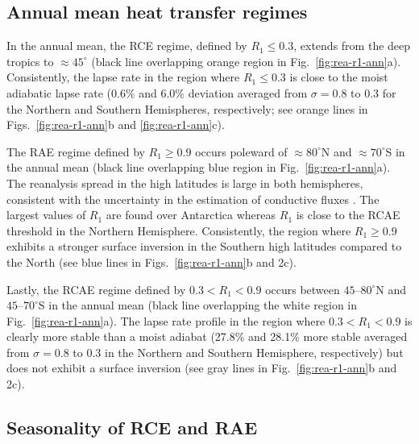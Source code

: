 \documentclass{ametsocV5}
\begin{document}
    \subsection{Annual mean heat transfer regimes}

    In the annual mean, the RCE regime, defined by $R_1 \le 0.3$, extends from the deep tropics to $\approx 45^\circ$ (black line overlapping orange region in Fig.~\ref{fig:rea-r1-ann}a). Consistently, the lapse rate in the region where $R_1 \le 0.3$ is close to the moist adiabatic lapse rate ($0.6$\% and 6.0\% deviation averaged from $\sigma=0.8$ to 0.3 for the Northern and Southern Hemispheres, respectively; see orange lines in Figs.~\ref{fig:rea-r1-ann}b and \ref{fig:rea-r1-ann}c).

    The RAE regime defined by $R_1 \ge 0.9$ occurs poleward of $\approx 80^\circ$N and $\approx 70^\circ$S in the annual mean (black line overlapping blue region in Fig.~\ref{fig:rea-r1-ann}a). The reanalysis spread in the high latitudes is large in both hemispheres, consistent with the uncertainty in the estimation of conductive fluxes \citep{tastula2013,graham2019}. The largest values of $R_1$ are found over Antarctica whereas $R_1$ is close to the RCAE threshold in the Northern Hemisphere. Consistently, the region where $R_1 \ge 0.9$ exhibits a stronger surface inversion in the Southern high latitudes compared to the North (see blue lines in Figs.~\ref{fig:rea-r1-ann}b and 2c).

    Lastly, the RCAE regime defined by $0.3 < R_1 < 0.9$ occurs between $45$--$80^\circ$N and $45$--$70^\circ$S in the annual mean (black line overlapping the white region in Fig.~\ref{fig:rea-r1-ann}a). The lapse rate profile in the region where $0.3 < R_1 < 0.9$ is clearly more stable than a moist adiabat (27.8\% and 28.1\% more stable averaged from $\sigma=0.8$ to 0.3 in the Northern and Southern Hemisphere, respectively) but does not exhibit a surface inversion (see gray lines in Fig.~\ref{fig:rea-r1-ann}b and 2c).

    \subsection{Seasonality of RCE and RAE} \label{subsec:seasonality}
\end{document}
